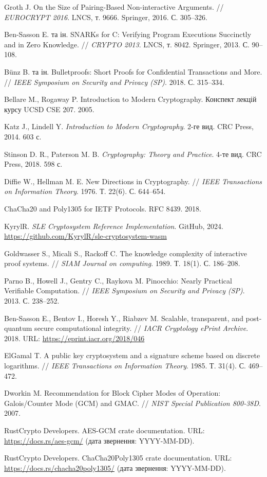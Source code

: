 \begin{thebibliography}{XX}
    Groth J. On the Size of Pairing-Based Non-interactive Arguments. // \textit{EUROCRYPT 2016}. LNCS, т. 9666. Springer, 2016. С. 305--326.

    Ben-Sasson E. та ін. SNARKs for C: Verifying Program Executions Succinctly and in Zero Knowledge. // \textit{CRYPTO 2013}. LNCS, т. 8042. Springer, 2013. С. 90--108.

    Bünz B. та ін. Bulletproofs: Short Proofs for Confidential Transactions and More. // \textit{IEEE Symposium on Security and Privacy (SP)}. 2018. С. 315--334.

    Bellare M., Rogaway P. Introduction to Modern Cryptography. Конспект лекцій курсу UCSD CSE 207. 2005.

    Katz J., Lindell Y. \textit{Introduction to Modern Cryptography}. 2-ге вид. CRC Press, 2014. 603 с.

    Stinson D. R., Paterson M. B. \textit{Cryptography: Theory and Practice}. 4-те вид. CRC Press, 2018. 598 с.

    Diffie W., Hellman M. E. New Directions in Cryptography. // \textit{IEEE Transactions on Information Theory}. 1976. Т. 22(6). С. 644--654.

    ChaCha20 and Poly1305 for IETF Protocols. RFC 8439. 2018.

    KyrylR. \textit{SLE Cryptosystem Reference Implementation}. GitHub, 2024. \url{https://github.com/KyrylR/sle-cryptosystem-wasm}

    Goldwasser S., Micali S., Rackoff C. The knowledge complexity of interactive proof systems. // \textit{SIAM Journal on computing}. 1989. Т. 18(1). С. 186--208.

    Parno B., Howell J., Gentry C., Raykova M. Pinocchio: Nearly Practical Verifiable Computation. // \textit{IEEE Symposium on Security and Privacy (SP)}. 2013. С. 238--252.

    Ben-Sasson E., Bentov I., Horesh Y., Riabzev M. Scalable, transparent, and post-quantum secure computational integrity. // \textit{IACR Cryptology ePrint Archive}. 2018. URL: \url{https://eprint.iacr.org/2018/046}

    ElGamal T. A public key cryptosystem and a signature scheme based on discrete logarithms. // \textit{IEEE Transactions on Information Theory}. 1985. Т. 31(4). С. 469--472.

    Dworkin M. Recommendation for Block Cipher Modes of Operation: Galois/Counter Mode (GCM) and GMAC. // \textit{NIST Special Publication 800-38D}. 2007.

    RustCrypto Developers. AES-GCM crate documentation. URL: \url{https://docs.rs/aes-gcm/} (дата звернення: YYYY-MM-DD).

    RustCrypto Developers. ChaCha20Poly1305 crate documentation. URL: \url{https://docs.rs/chacha20poly1305/} (дата звернення: YYYY-MM-DD).

\end{thebibliography}
